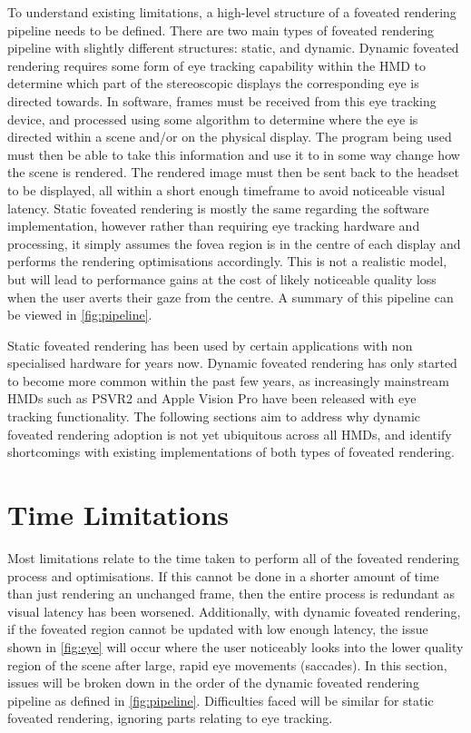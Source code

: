 \documentclass[a4paper,11pt]{article}
\begin{document}
To understand existing limitations, a high-level structure of a foveated rendering pipeline needs to be defined. There are two main types of foveated rendering pipeline with slightly different structures: static, and dynamic. Dynamic foveated rendering requires some form of eye tracking capability within the HMD to determine which part of the stereoscopic displays the corresponding eye is directed towards. In software, frames must be received from this eye tracking device, and processed using some algorithm to determine where the eye is directed within a scene and/or on the physical display. The program being used must then be able to take this information and use it to in some way change how the scene is rendered. The rendered image must then be sent back to the headset to be displayed, all within a short enough timeframe to avoid noticeable visual latency. Static foveated rendering is mostly the same regarding the software implementation, however rather than requiring eye tracking hardware and processing, it simply assumes the fovea region is in the centre of each display and performs the rendering optimisations accordingly. This is not a realistic model, but will lead to performance gains at the cost of likely noticeable quality loss when the user averts their gaze from the centre. A summary of this pipeline can be viewed in \cref{fig:pipeline}.

Static foveated rendering has been used by certain applications with non specialised hardware for years now. Dynamic foveated rendering has only started to become more common within the past few years, as increasingly mainstream HMDs such as PSVR2\cite{} and Apple Vision Pro\cite{} have been released with eye tracking functionality. The following sections aim to address why dynamic foveated rendering adoption is not yet ubiquitous across all HMDs, and identify shortcomings with existing implementations of both types of foveated rendering.

\section{Time Limitations}
Most limitations relate to the time taken to perform all of the foveated rendering process and optimisations. If this cannot be done in a shorter amount of time than just rendering an unchanged frame, then the entire process is redundant as visual latency has been worsened. Additionally, with dynamic foveated rendering, if the foveated region cannot be updated with low enough latency, the issue shown in \cref{fig:eye} will occur where the user noticeably looks into the lower quality region of the scene after large, rapid eye movements (saccades). In this section, issues will be broken down in the order of the dynamic foveated rendering pipeline as defined in \cref{fig:pipeline}. Difficulties faced will be similar for static foveated rendering, ignoring parts relating to eye tracking.
\end{document}
